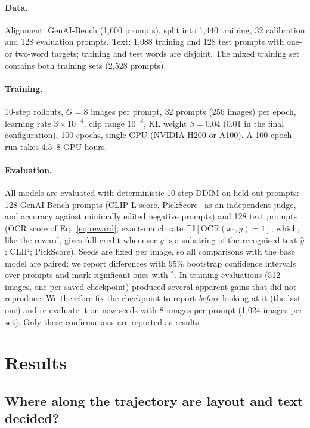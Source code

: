 \documentclass{article}
\begin{document}
\paragraph{Data.} Alignment: GenAI-Bench (1{,}600 prompts), split into 1{,}440 training, 32 calibration and 128 evaluation prompts.
Text: 1{,}088 training and 128 test prompts with one- or two-word targets; training and test words are disjoint. The mixed
training set contains both training sets (2{,}528 prompts).

\paragraph{Training.} 10-step rollouts, $G=8$ images per prompt, 32 prompts (256 images) per epoch, learning rate
$3\times10^{-4}$, clip range $10^{-3}$, KL weight $\beta=0.04$ (0.01 in the final configuration), 100 epochs, single
GPU (NVIDIA H200 or A100). A 100-epoch run takes 4.5--8 GPU-hours.

\paragraph{Evaluation.} All models are evaluated with deterministic 10-step DDIM on held-out prompts:
128 GenAI-Bench prompts (CLIP-L score, PickScore~\citep{kirstain2023pickapic} as an independent judge, and accuracy against
minimally edited negative prompts) and 128 text prompts (OCR score of Eq.~\ref{eq:reward}; exact-match rate
$\mathbb{E}\,\mathbb{I}[\mathrm{OCR}(x_0,y)=1]$, which, like the reward, gives full credit whenever $y$ is a substring of the
recognised text $\hat y$; CLIP; PickScore). Seeds are fixed per image, so all comparisons with the base model are paired; we report differences with 95\%
bootstrap confidence intervals over prompts and mark significant ones with $^{*}$. In-training evaluations (512 images,
one per saved checkpoint) produced several apparent gains that did not reproduce. We therefore fix the checkpoint to report
\emph{before} looking at it (the last one) and re-evaluate it on new seeds with 8 images per prompt (1{,}024 images per set).
Only these confirmations are reported as results.

\section{Results}
\label{sec:results}

\subsection{Where along the trajectory are layout and text decided?}
\label{sec:res_steps}
\end{document}
